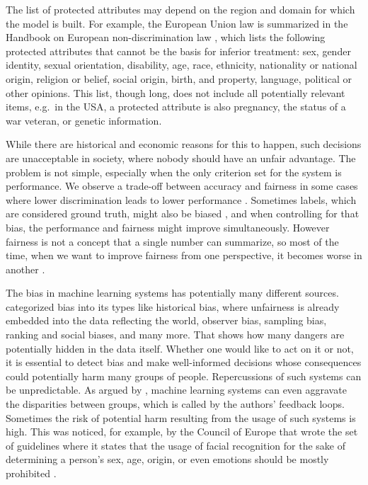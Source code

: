 The list of protected attributes may depend on the region and domain for
which the model is built. For example, the European Union law is
summarized in the Handbook on European non-discrimination law
\citet{European-non-discrimination}, which lists the following protected
attributes that cannot be the basis for inferior treatment: sex, gender
identity, sexual orientation, disability, age, race, ethnicity,
nationality or national origin, religion or belief, social origin,
birth, and property, language, political or other opinions. This list,
though long, does not include all potentially relevant items, e.g.~in
the USA, a protected attribute is also pregnancy, the status of a war
veteran, or genetic information.

While there are historical and economic reasons for this to happen, such
decisions are unacceptable in society, where nobody should have an
unfair advantage. The problem is not simple, especially when the only
criterion set for the system is performance. We observe a trade-off
between accuracy and fairness in some cases where lower discrimination
leads to lower performance \citep{kamiran}. Sometimes labels, which are
considered ground truth, might also be biased \citep{labelwrong}, and
when controlling for that bias, the performance and fairness might
improve simultaneously. However fairness is not a concept that a single
number can summarize, so most of the time, when we want to improve
fairness from one perspective, it becomes worse in another
\citep{barocas-hardt-narayanan}.

The bias in machine learning systems has potentially many different
sources. \citet{mehrabi2019survey} categorized bias into its types like
historical bias, where unfairness is already embedded into the data
reflecting the world, observer bias, sampling bias, ranking and social
biases, and many more. That shows how many dangers are potentially
hidden in the data itself. Whether one would like to act on it or not,
it is essential to detect bias and make well-informed decisions whose
consequences could potentially harm many groups of people. Repercussions
of such systems can be unpredictable. As argued by
\citet{barocas-hardt-narayanan}, machine learning systems can even
aggravate the disparities between groups, which is called by the
authors' feedback loops. Sometimes the risk of potential harm resulting
from the usage of such systems is high. This was noticed, for example,
by the Council of Europe that wrote the set of guidelines where it
states that the usage of facial recognition for the sake of determining
a person's sex, age, origin, or even emotions should be mostly
prohibited \citep{facialrecognition}.

